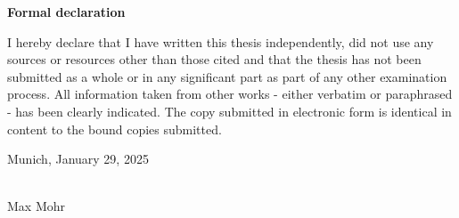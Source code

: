 \documentclass[12pt, a4paper, titlepage]{article}
\begin{document}
\newpage
{\Large\textbf{Formal declaration}}\\

\par I hereby declare that I have written this thesis independently, did not use any sources or resources other than those cited and that the thesis has not been submitted as a whole or in any significant part as part of any other examination process. All information taken from other works - either verbatim or paraphrased - has been clearly indicated. The copy submitted in electronic form is identical in content to the bound copies submitted.

\vspace{1cm}

Munich, January 29, 2025

\vspace{1cm}
\makebox[5cm]{\hrulefill}\\
Max Mohr
\end{document}
